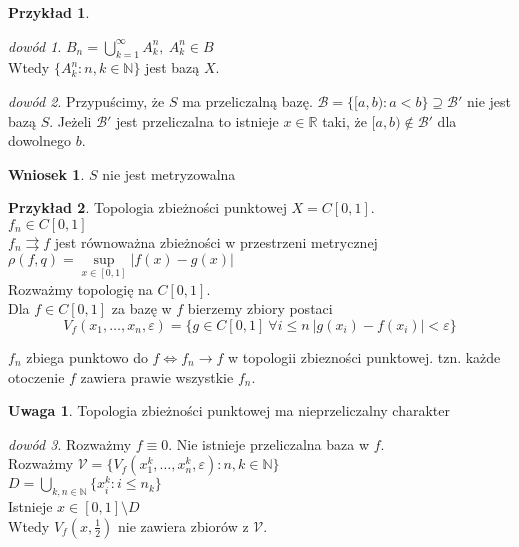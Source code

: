 \documentclass[twoside,10pt]{article}
\theoremstyle{definition}
\theoremstyle{definition}
\theoremstyle{definition}
\theoremstyle{definition}
\theoremstyle{remark}
\newtheorem*{dd}{dowód}
\theoremstyle{definition}
\newtheorem*{uw}{Uwaga}
\theoremstyle{definition}
\newtheorem*{wn}{Wniosek}
\theoremstyle{definition}
\theoremstyle{definition}
\newtheorem*{prz}{Przykład}
\theoremstyle{definition}
\theoremstyle{definition}
\begin{document}
\begin{prz}
\begin{itemize}
\begin{lem}
\begin{enumerate}[(1)]
\begin{dd}
                            $B_n = \bigcup\limits_{k=1}^\infty A_k^n,\ A_k^n \in B$ \\ 
                            Wtedy $\{ A^n_k : n, k \in \mathbb N\}$ jest bazą $X$.
                        \end{dd} 
                \end{enumerate}
            \end{lem} 
            \begin{dd} 
                Przypuścimy, że $S$ ma przeliczalną bazę. $\mathcal B = \{[a,b) : a < b \} \supseteq \mathcal B'$
                nie jest bazą $S$. Jeżeli $\mathcal B'$ jest przeliczalna to istnieje $x \in \mathbb R$ taki, że 
                $[a,b) \notin \mathcal B'$ dla dowolnego $b$.
            \end{dd} 
    \end{itemize} 
\end{prz}
\begin{wn} $S$ nie jest metryzowalna \end{wn} 
\begin{prz} 
    Topologia zbieżności punktowej $X = C[0,1]$. \\ 
    $f_n \in C[0,1]$ \\ 
    $f_n \rightrightarrows f$ jest równoważna zbieżności w przestrzeni metrycznej\\ 
    $\rho(f,q) = \sup\limits_{x \in [0,1]} |f(x) - g(x)|$ \\ 
    Rozważmy topologię na $C[0,1]$. \\ 
    Dla $f \in C[0,1]$ za bazę w $f$ bierzemy zbiory postaci
    \[ V_f (x_1,\ldots,x_n,\varepsilon) = \{ g \in C[0,1] \ \forall i \le n \ |g(x_i) - f(x_i)| < \varepsilon \} \]
\end{prz}
\begin{tw} 
    $f_n$ zbiega punktowo do $f \Leftrightarrow f_n \to f$ w topologii zbiezności punktowej. 
    tzn. każde otoczenie $f$ zawiera prawie wszystkie $f_n$.
\end{tw}    
\begin{uw} 
    Topologia zbieżności punktowej ma nieprzeliczalny charakter
\end{uw} 
\begin{dd} 
    Rozważmy $f \equiv 0$. Nie istnieje przeliczalna baza w $f$. \\ 
    Rozważmy $\mathcal V = \{ V_f (x_1^k,\ldots,x_n^k,\varepsilon): n,k \in \mathbb N\}$ \\ 
    $D = \bigcup\limits_{k,n \in \mathbb N} \{ x_i^k : i \le n_k \}$ \\ 
    Istnieje $x \in [0,1] \setminus D$ \\ 
    Wtedy $V_f(x,\frac{1}{2})$ nie zawiera zbiorów z $\mathcal V$. 
\end{dd}
\end{document}
